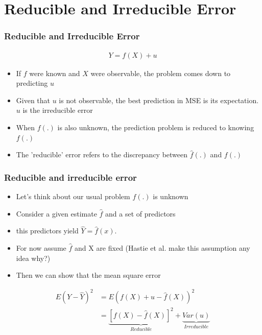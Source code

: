 \documentclass[
  shownotes,
  xcolor={svgnames},
  hyperref={colorlinks,citecolor=DarkBlue,linkcolor=DarkRed,urlcolor=DarkBlue}
  ]{beamer}
\begin{document}
\section{Reducible and Irreducible Error}
\begin{frame}
\frametitle{Reducible and Irreducible Error}



\begin{align}
  Y=f(X)+u 
\end{align}


\begin{itemize}
    \item  If $f$ were known and $X$ were observable, the problem comes down to predicting $u$
    \item  Given that $u$ is not observable, the best prediction in MSE is its expectation. $u$ is the irreducible error
    \item  When $f(.)$ is also unknown, the prediction problem is reduced to knowing $f(.)$
    \item  The 'reducible' error refers to the discrepancy between   $\hat f(.)$ and $f(.)$

\end{itemize}

\end{frame}
\begin{frame}
\frametitle{Reducible and irreducible error}

\begin{itemize}
\item Let's think about our usual problem $f(.)$ is unknown
\item Consider a given estimate $\hat f$ and a set of predictors
\item this predictors yield $\hat Y = \hat f(x)$. 
\item For now assume $\hat f$ and X are fixed {\tiny (Hastie et al. make this assumption any idea why?)}
\item Then we can show that the mean square error
\end{itemize}

\begin{align}
E(Y-\hat Y)^2 &= E(f(X)+u - \hat f(X))^2 \\
      &= \underset{Reducible}{\underbrace{[f(X)-\hat{f}(X)]^{2}}}+\underset{Irreducible}{\underbrace{Var(u)}}
\end{align}

\end{frame}
\end{document}
